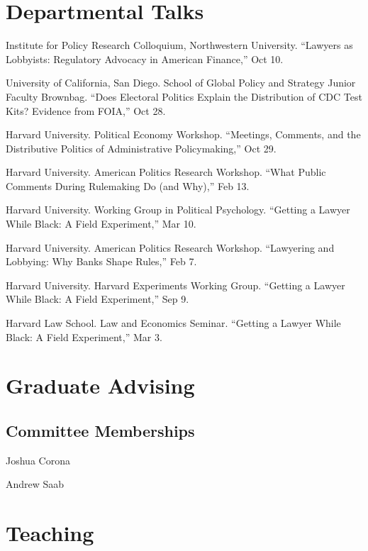 \documentclass[12pt,letterpaper]{report}
\newcommand{\talk}[4]{\item[#1]{\tab{}#3. \enquote{#2,} #4.}} %
\begin{document}

    \section*{Departmental Talks}

    \begin{tablist}
	\talk{2022}{Lawyers as Lobbyists: Regulatory Advocacy in American Finance}{Institute for Policy Research Colloquium, Northwestern University}{Oct 10}
    \talk{2020}{Does Electoral Politics Explain the Distribution of CDC Test Kits? Evidence from FOIA}{ University of California, San Diego. School of Global Policy and Strategy Junior Faculty Brownbag}{Oct 28}
    \talk{2018}{Meetings, Comments, and the Distributive Politics of Administrative Policymaking}{Harvard University. Political Economy Workshop}{Oct 29}
	\talk{2018}{What Public Comments During Rulemaking Do (and Why)}{Harvard University. American Politics Research Workshop}{Feb 13}
    \talk{2017}{Getting a Lawyer While Black: A Field Experiment}{Harvard University. Working Group in Political Psychology}{Mar 10}
    \talk{2017}{Lawyering and Lobbying: Why Banks Shape Rules}{Harvard University. American Politics Research Workshop}{Feb 7}
    \talk{2016}{Getting a Lawyer While Black: A Field Experiment}{Harvard University. Harvard Experiments Working Group}{Sep 9}
    \talk{2016}{Getting a Lawyer While Black: A Field Experiment}{Harvard Law School. Law and Economics Seminar}{Mar 3}
    \end{tablist}    
    \section*{Graduate Advising}
    \subsection*{Committee Memberships}
    \begin{tablist}
    \item Joshua Corona
    \item Andrew Saab
    \end{tablist}
	
    \section*{Teaching}
	
\end{document}
